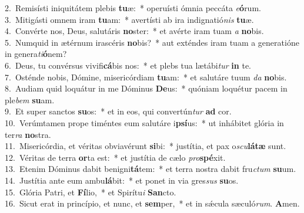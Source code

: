{2.~}Remisísti iniquitátem plebis \textbf{tu}æ:~* operuísti ómnia peccáta \textit{e}\textbf{ó}rum.\\
{3.~}Mitigásti omnem iram \textbf{tu}am:~* avertísti ab ira indignatió\textit{nis} \textbf{tu}æ.\\
{4.~}Convérte nos, Deus, salutáris \textbf{no}ster:~* et avérte iram tuam \textit{a} \textbf{no}bis.\\
{5.~}Numquid in ætérnum irascéris \textbf{no}bis?~* aut exténdes iram tuam a generatióne in genera\textit{ti}\textbf{ó}nem?\\
{6.~}Deus, tu convérsus vivifi\textbf{cá}bis nos:~* et plebs tua lætábi\textit{tur} \textbf{in} te.\\
{7.~}Osténde nobis, Dómine, misericórdiam \textbf{tu}am:~* et salutáre tuum \textit{da} \textbf{no}bis.\\
{8.~}Audiam quid loquátur in me Dóminus \textbf{De}us:~* quóniam loquétur pacem in ple\textit{bem} \textbf{su}am.\\
{9.~}Et super sanctos \textbf{su}os:~* et in eos, qui convertún\textit{tur} \textbf{ad} cor.\\
{10.~}Verúmtamen prope timéntes eum salutáre i\textbf{psí}us:~* ut inhábitet glória in ter\textit{ra} \textbf{no}stra.\\
{11.~}Misericórdia, et véritas obviavérunt \textbf{si}bi:~* justítia, et pax o\textit{scu}\textbf{lá}\textbf{tæ} sunt.\\
{12.~}Véritas de terra \textbf{or}ta est:~* et justítia de cælo \textit{pro}\textbf{spé}xit.\\
{13.~}Etenim Dóminus dabit benigni\textbf{tá}tem:~* et terra nostra dabit fru\textit{ctum} \textbf{su}um.\\
{14.~}Justítia ante eum ambu\textbf{lá}bit:~* et ponet in via gres\textit{sus} \textbf{su}os.\\
{15.~}Glória Patri, et \textbf{Fí}lio,~* et Spirítu\textit{i} \textbf{San}cto.\\
{16.~}Sicut erat in princípio, et nunc, et \textbf{sem}per,~* et in sǽcula sæculó\textit{rum}. \textbf{A}men.\\
